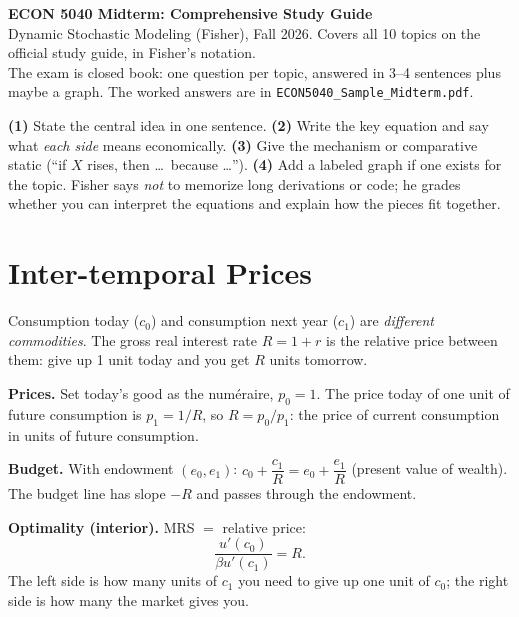 \documentclass[10pt]{article}
\begin{document}
\begin{center}
{\LARGE\bfseries\color{ink} ECON 5040 Midterm: Comprehensive Study Guide}\\[3pt]
{\small Dynamic Stochastic Modeling (Fisher), Fall 2026. Covers all 10 topics on the official study guide, in Fisher's notation.\\
The exam is closed book: one question per topic, answered in 3--4 sentences plus maybe a graph. The worked answers are in \texttt{ECON5040\_Sample\_Midterm.pdf}.}
\end{center}

\begin{tcolorbox}[colback=soft,colframe=ink,boxrule=0.6pt,arc=2pt,title={\bfseries How to write a full-credit answer (every topic)},fonttitle=\small]
\small
\textbf{(1)} State the central idea in one sentence. \textbf{(2)} Write the key equation and say what \emph{each side} means economically. \textbf{(3)} Give the mechanism or comparative static (``if $X$ rises, then \dots\ because \dots''). \textbf{(4)} Add a labeled graph if one exists for the topic. Fisher says \emph{not} to memorize long derivations or code; he grades whether you can interpret the equations and explain how the pieces fit together.
\end{tcolorbox}

\section{Inter-temporal Prices}

\begin{bigidea}
Consumption today ($c_0$) and consumption next year ($c_1$) are \emph{different commodities}. The gross real interest rate $R=1+r$ is the relative price between them: give up 1 unit today and you get $R$ units tomorrow.
\end{bigidea}

\begin{minipage}{0.56\textwidth}
\textbf{Prices.} Set today's good as the numéraire, $p_0=1$. The price today of one unit of future consumption is $p_1=1/R$, so $R=p_0/p_1$: the price of current consumption in units of future consumption.

\textbf{Budget.} With endowment $(e_0,e_1)$: $c_0+\dfrac{c_1}{R}=e_0+\dfrac{e_1}{R}$ (present value of wealth). The budget line has slope $-R$ and passes through the endowment.

\textbf{Optimality (interior).} MRS $=$ relative price:
\[\frac{u'(c_0)}{\beta u'(c_1)}=R.\]
The left side is how many units of $c_1$ you need to give up one unit of $c_0$; the right side is how many the market gives you.
\end{minipage}\hfill
\begin{minipage}{0.4\textwidth}\centering
\figIntertemporal
\end{minipage}
\end{document}
